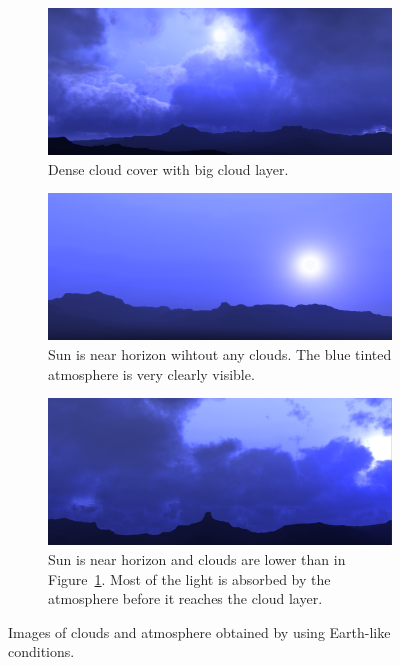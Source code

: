\documentclass{ctuthesis}
\begin{document}
\begin{figure}[h!]
     \centering
     \begin{subfigure}[b]{1.0\textwidth}
         \centering
         \includegraphics[width=\textwidth]{media/Alien_planet_1.png}
         \caption{Dense cloud cover with big cloud layer.}
         \label{fig:Fictional big cloud layer}
     \end{subfigure}
     \quad
     \begin{subfigure}[b]{1.0\textwidth}
         \centering
         \includegraphics[width=\textwidth]{media/Alien_planet_2.png}
         \caption{Sun is near horizon wihtout any clouds. The blue tinted atmosphere is very clearly visible.}
         \label{fig:Fictional no clouds}
     \end{subfigure}
     \quad
     \begin{subfigure}[b]{1.0\textwidth}
         \centering
         \includegraphics[width=\textwidth]{media/Alien_planet_3.png}
         \caption{Sun is near horizon and clouds are lower than in Figure~\ref{fig:Fictional big cloud layer}. 
            Most of the light is absorbed by the atmosphere before it reaches the cloud layer.}
         \label{fig:Fictional sunset clouds}
     \end{subfigure}
        \caption[Fictional planet]{Images of clouds and atmosphere obtained by using Earth-like conditions.}
        \label{fig:Fictional planet results}
\end{figure}
\end{document}
